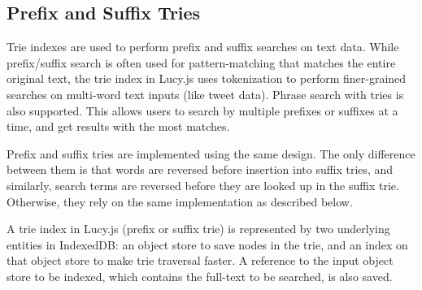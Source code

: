 \documentclass{vldb}
\begin{document}
\subsection{Prefix and Suffix Tries}

Trie indexes are used to perform prefix and suffix searches on text data. While prefix/suffix search is often used for pattern-matching that matches the entire original text, the trie index in Lucy.js uses tokenization to perform finer-grained searches on multi-word text inputs (like tweet data). Phrase search with tries is also supported. This allows users to search by multiple prefixes or suffixes at a time, and get results with the most matches.

Prefix and suffix tries are implemented using the same design. The only difference between them is that words are reversed before insertion into suffix tries, and similarly, search terms are reversed before they are looked up in the suffix trie. Otherwise, they rely on the same implementation as described below.

A trie index in Lucy.js (prefix or suffix trie) is represented by two underlying entities in IndexedDB: an object store to save nodes in the trie, and an index on that object store to make trie traversal faster.  A reference to the input object store to be indexed, which contains the full-text to be searched, is also saved.
\end{document}
